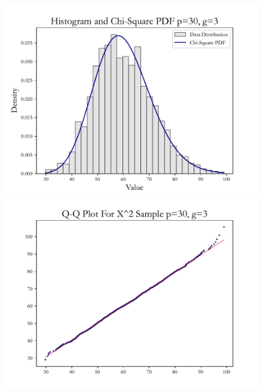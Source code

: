 \documentclass{article} %
\begin{document}
\begin{figure}[H]
    \centering
    \begin{minipage}[b]{0.49\textwidth}
        \centering
        \includegraphics[width=\textwidth]{img/b/hist_plot_p=30_g=3.pdf}
    \end{minipage}
    \hfill
    \begin{minipage}[b]{0.49\textwidth}
        \centering
        \includegraphics[width=\textwidth]{img/b/qq_plot_p=30_g=3.pdf}
    \end{minipage}
    

\end{figure}
\end{document}
